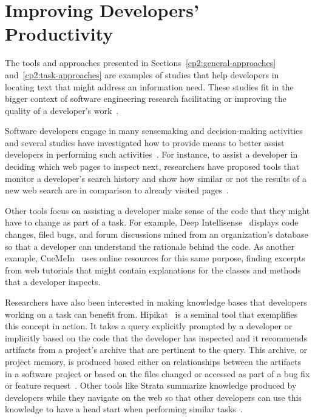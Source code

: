 



\section{Improving Developers' Productivity}
\label{cp2:dev-productivity}


The tools and approaches presented in Sections~\ref{cp2:general-approaches}
and~\ref{cp2:task-approaches}
are examples of studies that help developers in locating 
text that might address an information need.
These studies fit in the bigger context 
of software engineering research 
facilitating or improving the quality of a developer's work~\cite{Kersten2006, Meyer2017, satterfield2020}. 



Software developers engage in many sensemaking and decision-making activities~\cite{sillito2006} and several studies have investigated how to 
provide means to better  
assist developers in performing such activities~\cite{Liu2018Unakite, liu2021, barnett2015}.
For instance, to assist a developer in deciding which web pages to inspect next,
researchers have proposed tools that monitor a developer's search history
and show how similar or not the results of a new web search are in comparison to already visited 
pages~\cite{Ponzanelli2017}.



Other tools focus on assisting a developer make sense of the
code that they might have to change as part of a task. For example, 
Deep Intellisense~\cite{Holmes2008} displays code changes, filed bugs, and forum discussions
mined from an organization's database so that a developer can understand the rationale
behind the code.
As another example, CueMeIn~\cite{sun2021} uses online resources for this same purpose, 
finding excerpts from web tutorials 
that might contain explanations 
for the classes and methods that a developer inspects. 



Researchers have also been interested in 
making knowledge bases
that developers working on a task can benefit from. 
Hipikat~\cite{Cubranic2005} is a seminal tool that exemplifies this concept in action.
It takes a query explicitly prompted by a developer 
or implicitly based on the code that the developer 
has inspected and  
it recommends artifacts from a project's archive 
that are pertinent to the query.
This archive, or project memory, is produced 
based either on relationships between the artifacts in a software project 
or based on the files changed or accessed as part of a bug fix or feature request~\cite{Cubranic2005}.
Other tools like Strata summarize knowledge produced by developers 
while they navigate on the web so that other developers
can use this knowledge to have a 
 head start when performing similar tasks~\cite{liu2021}.


